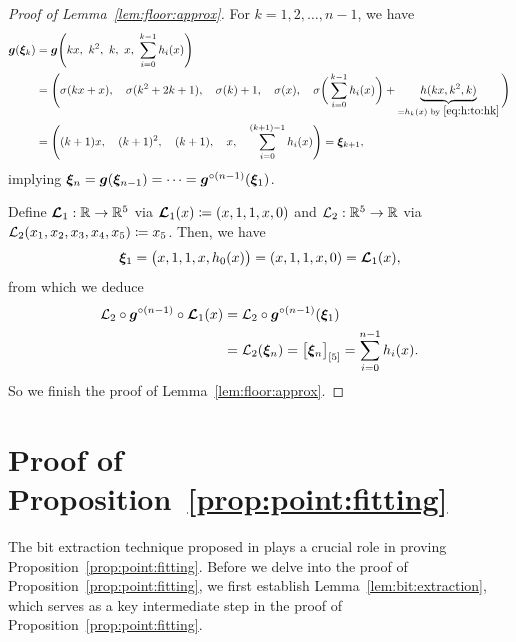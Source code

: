 \documentclass[nohyperref]{article}
\theoremstyle{plain}
\theoremstyle{definition}
\theoremstyle{remark}
\begin{document}
\begin{proof}[Proof of Lemma~\ref{lem:floor:approx}]
For $k=1,2,\dotsc,n-1$, we have
\begin{equation*}
	\begin{split}
		{\bm{g}}({\bm{\xi}}_k)
		&={\bm{g}}\Bigg(kx,\  k^2,\  k,\  x,\   \sum_{i=0}^{k-1}h_i(x)\Bigg)\\
		&=	\Bigg(\sigma(kx+x), \quad
		\sigma(k^2 + 2k +1), \quad
		\sigma(k)+1, \quad 
		\sigma(x), \quad
		\sigma\bigg(\sum_{i=0}^{k-1}h_i(x)\bigg)+\underbrace{h(kx,k^2,k)}_{=h_k(x)\textnormal{ by } \eqref{eq:h:to:hk}}\Bigg)\\
		&=	\Bigg((k+1)x, \quad
		(k+1)^2, \quad
		(k+1), \quad 
		x, \quad		\sum_{i=0}^{(k+1)-1}h_i(x)\Bigg)={\bm{\xi}}_{k+1},
	\end{split}
\end{equation*}
implying ${\bm{\xi}}_{n}={\bm{g}}({\bm{\xi}}_{n-1})=\mathinner{\mkern-0.1mu\cdotp\mkern-0.3mu\cdotp\mkern-0.3mu\cdotp\mkern-0.1mu}={\bm{g}}^{\circ (n-1)}({\bm{\xi}}_1)$. 

Define $\bmcalL_1:\R \to\R^5$ via ${\bm{\mathcal{L}}}_1(x)\coloneqq (x,1,1,x,0)$ and $\calL_2:\R^5\to\R$ via ${\mathcal{L}}_2(x_1,x_2,x_3,x_4,x_5)\coloneqq x_5$. Then, 
we have 
\begin{equation*}
	{\bm{\xi}}_1=\big(x,1,1,x,h_0(x)\big)=(x,1,1,x,0)={\bm{\mathcal{L}}}_1(x),
\end{equation*}
from which we deduce
\begin{equation*}
	\begin{split}
			{\mathcal{L}}_2\circ {\bm{g}}^{\circ (n-1)}\circ {\bm{\mathcal{L}}}_1(x)
		&= {\mathcal{L}}_2\circ {\bm{g}}^{\circ (n-1)}({\bm{\xi}}_1) \\
		&= {\mathcal{L}}_2({\bm{\xi}}_n)=\big[{\bm{\xi}}_n\big]_{[5]}
	= \sum_{i=0}^{n-1}h_i(x).
	\end{split}
\end{equation*}
So we finish the proof of Lemma~\ref{lem:floor:approx}.
\end{proof}

\section{Proof of Proposition~\ref{prop:point:fitting}}
\label{sec:proof:prop:point:fitting}


The bit extraction technique proposed in \cite{Bartlett98almostlinear} plays a crucial role in proving Proposition~\ref{prop:point:fitting}. Before we delve into the proof of Proposition~\ref{prop:point:fitting}, we first establish Lemma~\ref{lem:bit:extraction}, which serves as a key intermediate step in the proof of Proposition~\ref{prop:point:fitting}.
\end{document}
